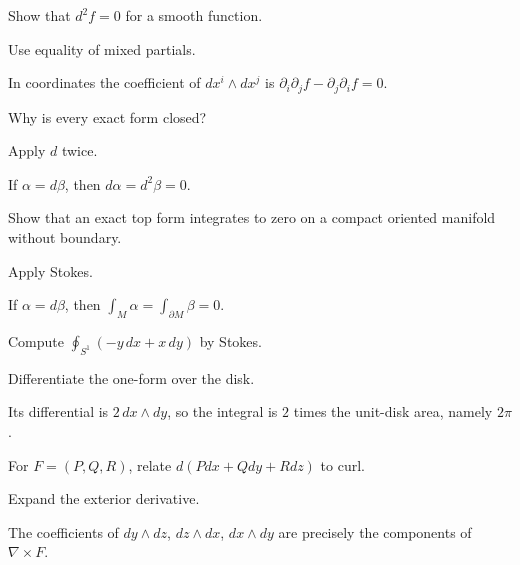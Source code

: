 \begin{exercise}\label{exr:vii11-09}
Show that $d^2f=0$ for a smooth function.
\end{exercise}
\begin{hint}
Use equality of mixed partials.
\end{hint}
\begin{solution}
In coordinates the coefficient of $dx^i\wedge dx^j$ is $\partial_i\partial_jf-\partial_j\partial_if=0$.
\end{solution}

\begin{exercise}\label{exr:vii11-10}
Why is every exact form closed?
\end{exercise}
\begin{hint}
Apply $d$ twice.
\end{hint}
\begin{solution}
If $\alpha=d\beta$, then $d\alpha=d^2\beta=0$.
\end{solution}

\begin{exercise}\label{exr:vii11-11}
Show that an exact top form integrates to zero on a compact oriented manifold without boundary.
\end{exercise}
\begin{hint}
Apply Stokes.
\end{hint}
\begin{solution}
If $\alpha=d\beta$, then $\int_M\alpha=\int_{\partial M}\beta=0$.
\end{solution}

\begin{exercise}\label{exr:vii11-12}
Compute $\oint_{S^1}(-y\,dx+x\,dy)$ by Stokes.
\end{exercise}
\begin{hint}
Differentiate the one-form over the disk.
\end{hint}
\begin{solution}
Its differential is $2\,dx\wedge dy$, so the integral is $2$ times the unit-disk area, namely $2\pi$.
\end{solution}

\begin{exercise}\label{exr:vii11-13}
For $F=(P,Q,R)$, relate $d(Pdx+Qdy+Rdz)$ to curl.
\end{exercise}
\begin{hint}
Expand the exterior derivative.
\end{hint}
\begin{solution}
The coefficients of $dy\wedge dz$, $dz\wedge dx$, $dx\wedge dy$ are precisely the components of $\nabla\times F$.
\end{solution}


